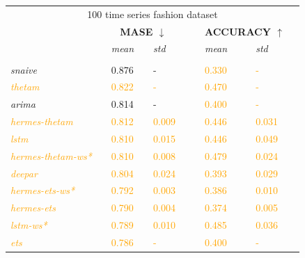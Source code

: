 \documentclass[10pt]{article} %
\begin{document}
\begin{table}
{  \begin{tabular}{l||lllll|lllll}
   \multicolumn{11}{c}{100 time series fashion dataset}\vspace{0.5cm}\\
   &&\multicolumn{3}{c}{\textbf{MASE $\downarrow$}} &&& \multicolumn{3}{c}{\textbf{ACCURACY $\uparrow$}}&\\
   &&  \textit{mean}  && \textit{std} &&&  \textit{mean}  && \textit{std}& \\
	 \hline
	 &&&&&&&&&&\\
     \textit{snaive} && 0.876 && - &&& \textcolor{orange}{0.330} && \textcolor{orange}{-} &\\
     \textcolor{orange}{\textit{thetam}} && \textcolor{orange}{0.822} && \textcolor{orange}{-} &&& \textcolor{orange}{0.470} && \textcolor{orange}{-} &\\
     \textit{arima} && 0.814 && - &&& \textcolor{orange}{0.400} && \textcolor{orange}{-} &\\
     \textcolor{orange}{\textit{hermes-thetam}} && \textcolor{orange}{0.812} && \textcolor{orange}{0.009} &&& \textcolor{orange}{0.446} && \textcolor{orange}{0.031} &\\
     \textcolor{orange}{\textit{lstm}} && \textcolor{orange}{0.810} && \textcolor{orange}{0.015} &&& \textcolor{orange}{0.446} && \textcolor{orange}{0.049} &\\
     \textcolor{orange}{\textit{hermes-thetam-ws*}} && \textcolor{orange}{0.810} && \textcolor{orange}{0.008} &&& \textcolor{orange}{0.479} && \textcolor{orange}{0.024} &\\
     \textcolor{orange}{\textit{deepar}} && \textcolor{orange}{0.804} && \textcolor{orange}{0.024} &&& \textcolor{orange}{0.393} && \textcolor{orange}{0.029} &\\
     \textcolor{orange}{\textit{hermes-ets-ws*}} && \textcolor{orange}{0.792} && \textcolor{orange}{0.003} &&& \textcolor{orange}{0.386} && \textcolor{orange}{0.010} &\\
     \textcolor{orange}{\textit{hermes-ets}} && \textcolor{orange}{0.790} && \textcolor{orange}{0.004} &&& \textcolor{orange}{0.374} && \textcolor{orange}{0.005} &\\
     \textcolor{orange}{\textit{lstm-ws*}} && \textcolor{orange}{0.789} && \textcolor{orange}{0.010} &&& \textcolor{orange}{0.485} && \textcolor{orange}{0.036} &\\
     \textcolor{orange}{\textit{ets}} && \textcolor{orange}{0.786} && \textcolor{orange}{-} &&& \textcolor{orange}{0.400} && \textcolor{orange}{-} &\\

\end{tabular}}
\end{table}
\end{document}
